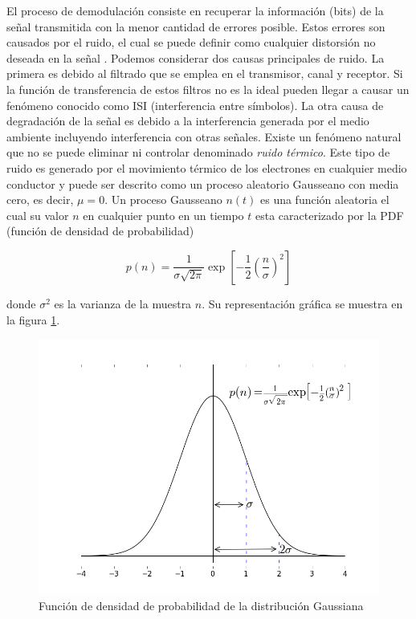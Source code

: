 El proceso de demodulaci\'on consiste en recuperar la informaci\'on (bits) de la se\~nal
transmitida con la menor cantidad de errores posible. Estos errores son causados por el ruido, el
cual se puede definir como cualquier distorsi\'on no deseada en la se\~nal \cite{sklar}. Podemos considerar dos
causas principales de ruido. La primera es debido al filtrado que se emplea en el transmisor, canal
y receptor. Si la funci\'on de transferencia de estos filtros no es la ideal pueden llegar a causar
un fen\'omeno conocido como ISI (interferencia entre s\'imbolos). La otra causa de degradaci\'on de
la se\~nal es debido a la interferencia generada por el medio ambiente incluyendo interferencia con
otras se\~nales. Existe un fen\'omeno natural que no se puede eliminar ni controlar denominado
\emph{ruido t\'ermico}. Este tipo de ruido es generado por el movimiento t\'ermico de los electrones
en cualquier medio conductor y puede ser descrito como un proceso aleatorio Gausseano con media cero, es decir, $\mu=0$. Un
proceso Gausseano $n(t)$ es una funci\'on aleatoria el cual su valor $n$ en cualquier punto en un tiempo $t$ esta
caracterizado por la PDF (funci\'on de densidad de probabilidad)

\begin{equation}\label{eq:gauss}
p(n)=\frac{1}{\sigma\sqrt{2\pi}}\exp\left[-\frac{1}{2}\left(\frac{n}{\sigma}\right)^2\right]
\end{equation}

donde $\sigma^2$ es la varianza de la muestra $n$. Su representaci\'on gr\'afica se muestra en la figura \ref{fig:gauss}.

\begin{figure}[ht]
\centering
	\includegraphics[width=5.5in]{figs/gauss}
	\caption{Funci\'on de densidad de probabilidad de la distribuci\'on Gaussiana}
	\label{fig:gauss}
\end{figure}

